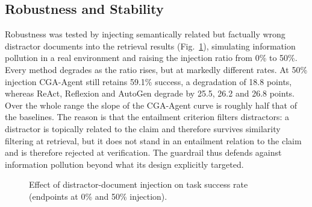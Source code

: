 \documentclass[journal,10pt,a4paper]{IEEEtran}
\begin{document}
\begin{table}[t]
\caption{Ablation Results on CE-Bench (Mean over Three Seeds)}
\label{tab:ablation}
\centering
\footnotesize
{}
\end{table}

\subsection{Robustness and Stability}
\label{sec:robust}
Robustness was tested by injecting semantically related but factually wrong distractor documents into the retrieval results (Fig.~\ref{fig:distract}), simulating information pollution in a real environment and raising the injection ratio from 0\% to 50\%. Every method degrades as the ratio rises, but at markedly different rates. At 50\% injection CGA-Agent still retains 59.1\% success, a degradation of 18.8 points, whereas ReAct, Reflexion and AutoGen degrade by 25.5, 26.2 and 26.8 points. Over the whole range the slope of the CGA-Agent curve is roughly half that of the baselines. The reason is that the entailment criterion filters distractors: a distractor is topically related to the claim and therefore survives similarity filtering at retrieval, but it does not stand in an entailment relation to the claim and is therefore rejected at verification. The guardrail thus defends against information pollution beyond what its design explicitly targeted.

\begin{figure}[t]
\centering
{}
\caption{Effect of distractor-document injection on task success rate (endpoints at 0\% and 50\% injection).}
\label{fig:distract}
\end{figure}
\end{document}
